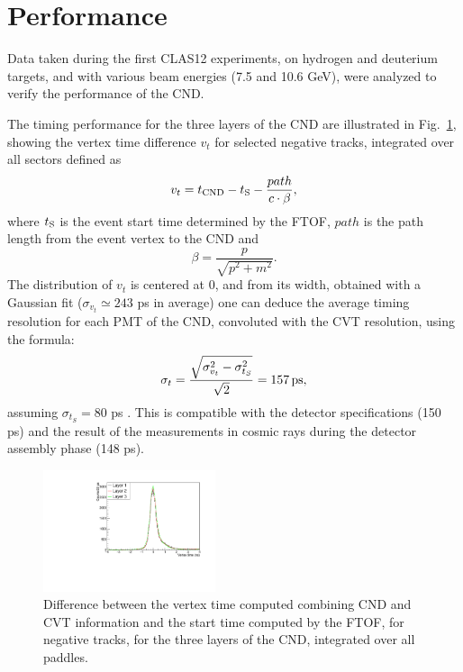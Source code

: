 \section{Performance}

Data taken during the first CLAS12 experiments, on hydrogen and deuterium targets, and with various beam energies (7.5 and 10.6 GeV), were analyzed to verify the performance of the CND. 

The timing performance for the three layers of the CND are illustrated in Fig.~\ref{fig_performance_deltat_layers}, showing the vertex time difference $v_t$ for selected negative tracks, integrated over all sectors defined as
\begin{equation}\label{eq_vtp_definition}
v_t=t_{\rm{CND}}-t_{\rm{S}}-\frac{path}{c \cdot \beta} ,
\end{equation}
where $t_{\rm{S}}$ is the event start time determined by the FTOF, $path$ is the path length from the event vertex to the CND and
\begin{equation}\label{eq_beta_definition}
\beta=\frac{p}{\sqrt{p^2+m^2}} .
\end{equation}
The distribution of $v_t$ is centered at 0, and from its width, obtained with a Gaussian fit ($\sigma_{v_t}\simeq 243$ ps in average) one can deduce the average timing resolution for each PMT of the CND, convoluted with the CVT resolution, using the formula:
\begin{equation}\label{eq_resolution}
\sigma_t=\frac{\sqrt{\sigma_{v_t}^2-\sigma_{t_{S}}^2}}{\sqrt{2}}=157\, \rm{ps}, 
\end{equation}
assuming $\sigma_{t_{S}}=80$ ps \cite{ftof-nim}. This is compatible with the detector specifications (150 ps) and the result of the measurements in cosmic rays during the detector assembly phase \cite{Niccolai:2018qzm} (148 ps).

\begin{figure}[htb]  
\begin{center}
\includegraphics[width=0.45\textwidth]{Figure/canVTPlot.pdf}
\caption {Difference between the vertex time computed combining CND and CVT information and the start time computed by the FTOF, for negative tracks, for the three layers of the CND, integrated over all paddles. }
\label{fig_performance_deltat_layers}
\end{center}
\end{figure}

